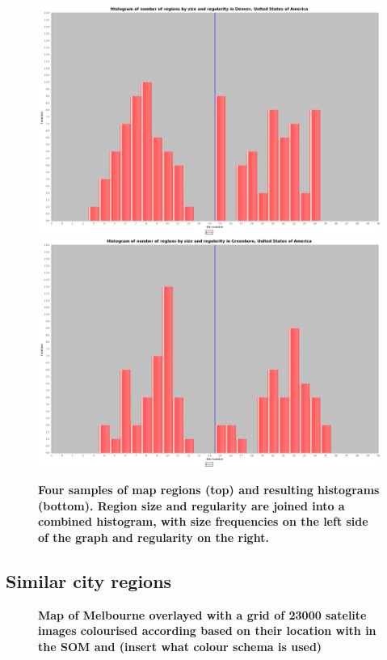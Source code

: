 \documentclass[final,3p,times,authoryear]{elsarticle}
\begin{document}
\begin{figure}[!htbp]
\includegraphics[scale=0.06]{Images/Combinedcity169-59949.png}
\includegraphics[scale=0.06]{Images/Combinedcity1521-754459.png}
\caption{\bf Four samples of map regions (top) and resulting histograms (bottom). Region size and regularity are joined into a combined histogram, with size frequencies on the left side of the graph and regularity on the right.}    
 \label{fig:mapsandHist}  
\end{figure} 

\subsection{Similar city regions}\label{methodssimilarity}

\begin{figure}[!htbp]
\centering  
\caption{\bf Map of Melbourne overlayed with a grid of 23000 satelite images colourised according based on their location with in the SOM and (insert what colour schema is used) }   
 \label{fig:clustermapsimages}  
\end{figure} 
\end{document}
